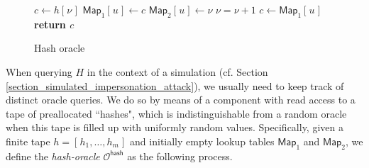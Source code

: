 \documentclass[psamsfonts, reqno]{amsart}
\theoremstyle{definition}
\theoremstyle{remark}
\numberwithin{equation}{section}
\begin{document}
\begin{figure}
\begin{minipage}{0.42\textwidth}
\begin{algorithm}[H]
    \centering
    \caption{$\mathcal{O}^{\mathsf{hash}}(u)$}\label{hash_oracle}
    \begin{algorithmic}
        \vspace{3pt}
            \State
            	$c \leftarrow h[\hspace{1pt}\nu\hspace{1pt}]$\vspace{4pt}
        	\State
        		$\mathsf{Map}_1[\hspace{1pt}u\hspace{1pt}]
        		\leftarrow c$\vspace{3pt}
        		\State
        		$\mathsf{Map}_2[\hspace{1pt}u\hspace{1pt}]
        		\leftarrow \nu$\vspace{3pt}
        	\State
        		$\nu = \nu + 1$\vspace{0pt}
        \Else
        	\State
        		$c \leftarrow \mathsf{Map}_1
        		[\hspace{1pt}u\hspace{1pt}]$\vspace{0pt}
        \EndIf
        \State \textbf{return $c$}
    \end{algorithmic}
\end{algorithm}\vspace{0pt}
\end{minipage}
\caption{Hash oracle}
\label{fig_hash_oracle}
\end{figure}

\noindent
When querying $H$ in the context of a simulation
(cf. Section \ref{section_simulated_impersonation_attack}),
we usually need to keep track of distinct oracle queries.
We do so by means of a component with read access to a tape
of preallocated ``hashes", which is indistinguishable from
a random oracle when this tape is filled up
with uniformly random values.
Specifically,
given a finite tape
$h = [\hspace{1pt}h_1, \dots, h_m \hspace{1pt}]$
and initially empty lookup tables
$\mathsf{Map}_1$ and $\mathsf{Map}_2$,
we define the \textit{hash-oracle} $\mathcal{O}^{\mathsf{hash}}$
as the following process.
\end{document}
